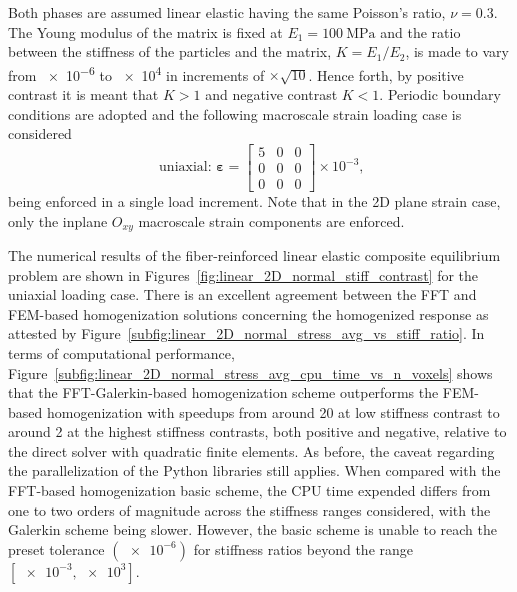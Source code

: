 Both phases are assumed linear elastic having the same Poisson's ratio, \(\nu=0.3\).
The Young modulus of the matrix is fixed at \(E_1=\SI{100}{\mega\pascal}\) and the ratio between the stiffness of the particles and the matrix, \(K=E_1/E_2\), is made to vary from \num{e-6} to \num{e4} in increments of \(\times \sqrt{10}\).
Hence forth, by positive contrast it is meant that \(K>1\) and negative contrast \(K<1\).
Periodic boundary conditions are adopted and the following macroscale strain loading case is considered
\begin{equation}
\text { uniaxial: } \bm{\varepsilon}=\left[\begin{array}{lll}
5 & 0 & 0 \\
0 & 0 & 0 \\
0 & 0 & 0
\end{array}\right] \times 10^{-3},
\end{equation}
being enforced in a single load increment.
Note that in the 2D plane strain case, only the inplane \(O_{x y}\) macroscale strain components are enforced.

The numerical results of the fiber-reinforced linear elastic composite equilibrium problem are shown in Figures~\ref{fig:linear_2D_normal_stiff_contrast} for the uniaxial loading case.
There is an excellent agreement between the FFT and FEM-based homogenization solutions concerning the homogenized response as attested by Figure~\ref{subfig:linear_2D_normal_stress_avg_vs_stiff_ratio}.
In terms of computational performance, Figure~\ref{subfig:linear_2D_normal_stress_avg_cpu_time_vs_n_voxels} shows that the FFT-Galerkin-based homogenization scheme outperforms the FEM-based homogenization with speedups from around 20 at low stiffness contrast to around 2 at the highest stiffness contrasts, both positive and negative, relative to the direct solver with quadratic finite elements.
As before, the caveat regarding the parallelization of the Python libraries still applies.
When compared with the FFT-based homogenization basic scheme, the CPU time expended differs from one to two orders of magnitude across the stiffness ranges considered, with the Galerkin scheme being slower.
However, the basic scheme is unable to reach the preset tolerance \((\num{e-6})\) for stiffness ratios beyond the range \([\num{e-3},\num{e3}]\).

